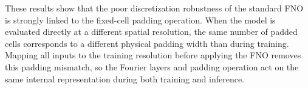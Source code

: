 These results show that the poor discretization robustness of the standard FNO is strongly linked to the fixed-cell padding operation. When the model is evaluated directly at a different spatial resolution, the same number of padded cells corresponds to a different physical padding width than during training. Mapping all inputs to the training resolution before applying the FNO removes this padding mismatch, so the Fourier layers and padding operation act on the same internal representation during both training and inference.